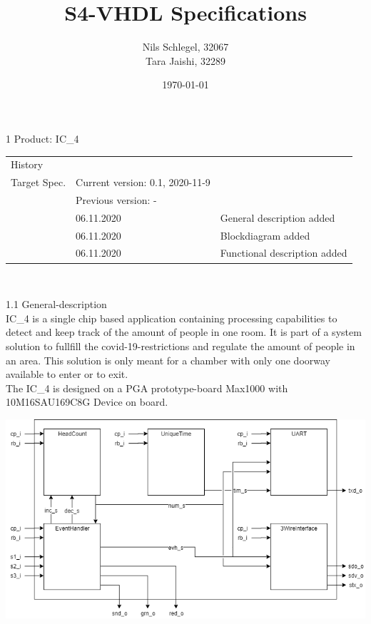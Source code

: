 \documentclass[a4paper,12pt]{book}
\begin{document}
\title{S4-VHDL Specifications}
\author{Nils Schlegel, 32067\\Tara Jaishi, 32289}
\date{\today}
\maketitle %

\setcounter{chapter}{0}


1 Product: IC{\_}4 \\
\begin{center}
\begin{tabularx}{\textwidth}{llX}
History \\
\cline{1-3}
Target Spec. & Current version: 0.1, 2020-11-9 \\
& Previous version: - \\
\cline{1-3}
& 06.11.2020 & General description added \\
& 06.11.2020 & Blockdiagram added \\
& 06.11.2020 & Functional description added \\
\end{tabularx} \\
\end{center}
1.1 General-description \\
IC{\_}4 is a single chip based application containing processing capabilities to detect and keep track of the amount of people in one room. It is part of a system solution to fullfill the covid-19-restrictions and  regulate the amount of people in an area. This solution is only meant for a chamber with only one doorway available to enter or to exit. \\
The IC{\_}4 is designed on a PGA prototype-board Max1000 with 10M16SAU169C8G Device on board.

\begin{center}\includegraphics[width=1\textwidth]{../png/top}\end{center}
\end{document}
